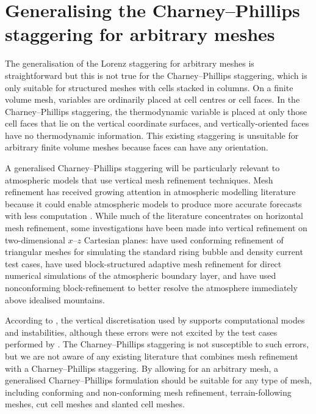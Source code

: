 \section{Generalising the Charney–Phillips staggering for arbitrary meshes}
\label{sec:cp:method}

The generalisation of the Lorenz staggering for arbitrary meshes is straightforward \citep{weller-shahrokhi2014} but this is not true for the Charney--Phillips staggering, which is only suitable for structured meshes with cells stacked in columns.
On a finite volume mesh, variables are ordinarily placed at cell centres or cell faces.
In the Charney--Phillips staggering, the thermodynamic variable is placed at only those cell faces that lie on the vertical coordinate surfaces, and vertically-oriented faces have no thermodynamic information.
This existing staggering is unsuitable for arbitrary finite volume meshes because faces can have any orientation.

A generalised Charney--Phillips staggering will be particularly relevant to atmospheric models that use vertical mesh refinement techniques.
Mesh refinement has received growing attention in atmospheric modelling literature because it could enable atmospheric models to produce more accurate forecasts with less computation \citep{behrens2006,jablonowski2009}.
While much of the literature concentrates on horizontal mesh refinement, some investigations have been made into vertical refinement on two-dimensional $x$--$z$ Cartesian planes:
\citet{mueller2013} have used conforming refinement of triangular meshes for simulating the standard rising bubble and density current test cases, \citet{vanhooft2018} have used block-structured adaptive mesh refinement for direct numerical simulations of the atmospheric boundary layer, and \citet{yamazaki-satomura2012} have used nonconforming block-refinement to better resolve the atmosphere immediately above idealised mountains.

According to \citet{thuburn-woolings2005}, the vertical discretisation used by \citet{yamazaki-satomura2012} supports computational modes and instabilities, although these errors were not excited by the test cases performed by \citet{yamazaki-satomura2012}.
The Charney--Phillips staggering is not susceptible to such errors, but we are not aware of any existing literature that combines mesh refinement with a Charney--Phillips staggering.
By allowing for an arbitrary mesh, a generalised Charney--Phillips formulation should be suitable for any type of mesh, including conforming and non-conforming mesh refinement, terrain-following meshes, cut cell meshes and slanted cell meshes.


